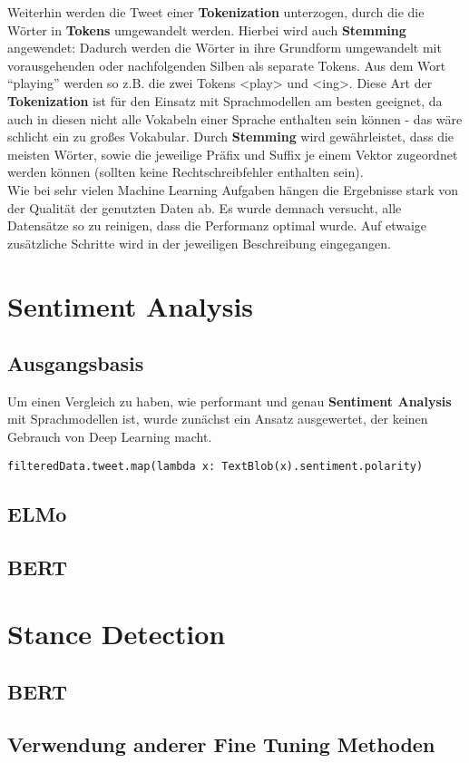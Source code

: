 
Weiterhin werden die Tweet einer \textbf{Tokenization} unterzogen, durch die die W\"orter in \textbf{Tokens} umgewandelt werden. Hierbei wird auch \textbf{Stemming} angewendet: Dadurch werden die W\"orter in ihre Grundform umgewandelt mit vorausgehenden oder nachfolgenden Silben als separate Tokens. Aus dem Wort "`playing"' werden so z.B. die zwei Tokens <play> und <ing>. Diese Art der \textbf{Tokenization} ist f\"ur den Einsatz mit Sprachmodellen am besten geeignet, da auch in diesen nicht alle Vokabeln einer Sprache enthalten sein k\"onnen - das w\"are schlicht ein zu gro{\ss}es Vokabular. Durch \textbf{Stemming} wird gew\"ahrleistet, dass die meisten W\"orter, sowie die jeweilige Präfix und Suffix je einem Vektor zugeordnet werden k\"onnen (sollten keine Rechtschreibfehler enthalten sein).\\
Wie bei sehr vielen Machine Learning Aufgaben h\"angen die Ergebnisse stark von der Qualit\"at der genutzten Daten ab. Es wurde demnach versucht, alle Datens\"atze so zu reinigen, dass die Performanz optimal wurde. Auf etwaige zus\"atzliche Schritte wird in der jeweiligen Beschreibung eingegangen.

\section{Sentiment Analysis}



\subsection{Ausgangsbasis}
Um einen Vergleich zu haben, wie performant und genau \textbf{Sentiment Analysis} mit Sprachmodellen ist, wurde zun\"achst ein Ansatz ausgewertet, der keinen Gebrauch von Deep Learning macht. 
\lstset{language=Python}
\lstset{frame=lines}
\lstset{captionpos=b}
\lstset{basicstyle=\footnotesize}
\begin{lstlisting}
filteredData.tweet.map(lambda x: TextBlob(x).sentiment.polarity)
\end{lstlisting}

\subsection{ELMo}

\subsection{BERT}



\section{Stance Detection}

\subsection{BERT}

\subsection{Verwendung anderer Fine Tuning Methoden}